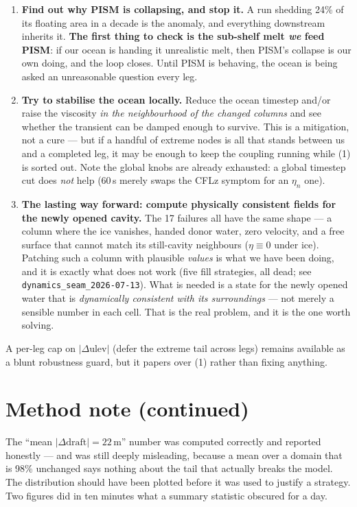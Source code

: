 \documentclass[11pt,a4paper]{article}
\begin{document}
\begin{enumerate}
\item \textbf{Find out why PISM is collapsing, and stop it.} A run shedding 24\% of its floating area
      in a decade is the anomaly, and everything downstream inherits it. \textbf{The first thing to
      check is the sub-shelf melt \emph{we} feed PISM}: if our ocean is handing it unrealistic melt,
      then PISM's collapse is our own doing, and the loop closes. Until PISM is behaving, the ocean
      is being asked an unreasonable question every leg.

\item \textbf{Try to stabilise the ocean locally.} Reduce the ocean timestep and/or raise the
      viscosity \emph{in the neighbourhood of the changed columns} and see whether the transient can
      be damped enough to survive. This is a mitigation, not a cure --- but if a handful of extreme
      nodes is all that stands between us and a completed leg, it may be enough to keep the coupling
      running while (1) is sorted out. Note the global knobs are already exhausted: a global timestep
      cut does \emph{not} help (60\,s merely swaps the CFLz symptom for an $\eta_n$ one).

\item \textbf{The lasting way forward: compute physically consistent fields for the newly opened
      cavity.} The 17 failures all have the same shape --- a column where the ice vanishes, handed
      donor water, zero velocity, and a free surface that cannot match its still-cavity neighbours
      ($\eta \equiv 0$ under ice). Patching such a column with plausible \emph{values} is what we
      have been doing, and it is exactly what does not work (five fill strategies, all dead; see
      \texttt{dynamics\_seam\_2026-07-13}). What is needed is a state for the newly opened water that
      is \emph{dynamically consistent with its surroundings} --- not merely a sensible number in each
      cell. That is the real problem, and it is the one worth solving.
\end{enumerate}

\noindent
A per-leg cap on $|\Delta\mathrm{ulev}|$ (defer the extreme tail across legs) remains available as a
blunt robustness guard, but it papers over (1) rather than fixing anything.

\section{Method note (continued)}

The ``mean $|\Delta\mathrm{draft}| = 22$\,m'' number was computed correctly and reported honestly ---
and was still deeply misleading, because a mean over a domain that is 98\% unchanged says nothing
about the tail that actually breaks the model. The distribution should have been plotted before it
was used to justify a strategy. Two figures did in ten minutes what a summary statistic obscured for
a day.
\end{document}
